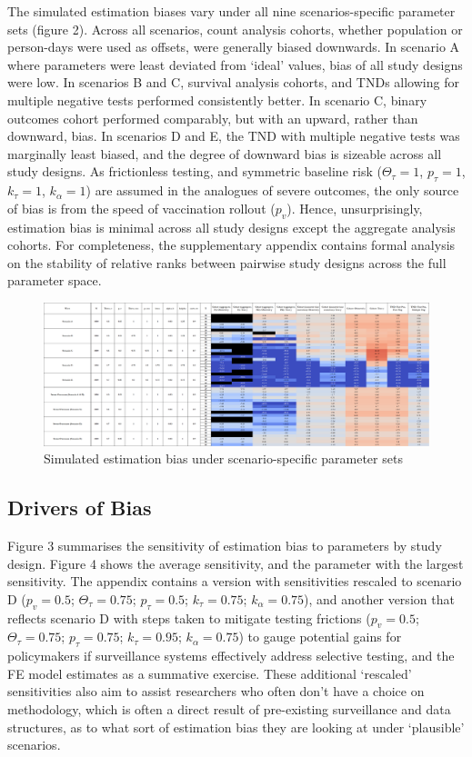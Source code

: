 \documentclass[12pt]{article}
\begin{document}
The simulated estimation biases vary under all nine scenarios-specific parameter sets (figure 2). Across all scenarios, count analysis cohorts, whether population or person-days were used as offsets, were generally biased downwards. In scenario A where parameters were least deviated from `ideal' values, bias of all study designs were low. In scenarios B and C, survival analysis cohorts, and TNDs allowing for multiple negative tests performed consistently better. In scenario C, binary outcomes cohort performed comparably, but with an upward, rather than downward, bias. In scenarios D and E, the TND with multiple negative tests was marginally least biased, and the degree of downward bias is sizeable across all study designs. As frictionless testing, and symmetric baseline risk ($\Theta_{\tau} = 1$, $p_\tau = 1$, $k_\tau = 1$, $k_\alpha = 1$) are assumed in the analogues of severe outcomes, the only source of bias is from the speed of vaccination rollout ($p_v$). Hence, unsurprisingly, estimation bias is minimal across all study designs except the aggregate analysis cohorts. For completeness, the supplementary appendix contains formal analysis on the stability of relative ranks between pairwise study designs across the full parameter space. 

\begin{figure}[H]
	\centering
	\caption{Simulated estimation bias under scenario-specific parameter sets}
	\includegraphics[scale=0.26]{VEMethod_Sim1b_WaveSpecific_Heatmap.png}
\end{figure}

\subsection{Drivers of Bias}

Figure 3 summarises the sensitivity of estimation bias to parameters by study design. Figure 4 shows the average sensitivity, and the parameter with the largest sensitivity. The appendix contains a version with sensitivities rescaled to scenario D ($p_v=0.5$; $\Theta_{\tau}=0.75$; $p_\tau=0.5$; $k_\tau=0.75$; $k_\alpha=0.75$), and another version that reflects scenario D with steps taken to mitigate testing frictions ($p_v=0.5$; $\Theta_{\tau}=0.75$; $p_\tau=0.75$; $k_\tau=0.95$; $k_\alpha=0.75$) to gauge potential gains for policymakers if surveillance systems effectively address selective testing, and the FE model estimates as a summative exercise. These additional `rescaled' sensitivities also aim to assist researchers who often don't have a choice on methodology, which is often a direct result of pre-existing surveillance and data structures, as to what sort of estimation bias they are looking at under `plausible' scenarios.
\end{document}
